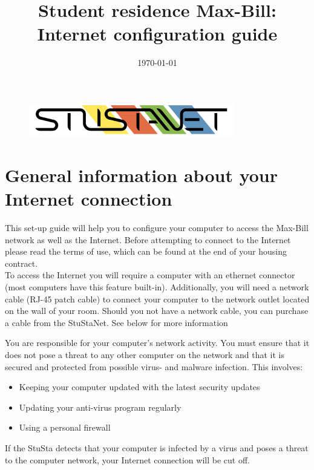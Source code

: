 \documentclass[a4paper,12pt]{scrartcl}
\title{Student residence Max-Bill:\\
       Internet configuration guide}
\date{\today}
\begin{document}
\maketitle

\begin{figure}[t!]
   \centering
   \vspace{-20pt}
   \includegraphics[width=0.8\textwidth,keepaspectratio]{Bilder/StuStaNet_Logo}
   \vspace{-20pt}
\end{figure}

\section*{General information about your Internet connection}

This set-up guide will help you to configure your computer to access the Max-Bill network as well as the Internet. Before attempting to connect to the Internet please read the terms of use, which can be found at the end of your housing contract.
\\
To access the Internet you will require a computer with an ethernet connector (most computers have this feature built-in). Additionally, you will need a network cable (RJ-45 patch cable) to connect your computer to the network outlet located on the wall of your room. Should you not have a network cable, you can purchase a cable from the StuStaNet. See below for more information


You are responsible for your computer's network activity. You must ensure that it does not pose a threat to any other computer on the network and that it is secured and protected from possible virus- and malware infection. This involves:
\begin{itemize}
    \item Keeping your computer updated with the latest security updates
    \item Updating your anti-virus program regularly
    \item Using a personal firewall
\end{itemize}
If the StuSta detects that your computer is infected by a virus and poses a threat to the computer network, your Internet connection will be cut off.
\end{document}
